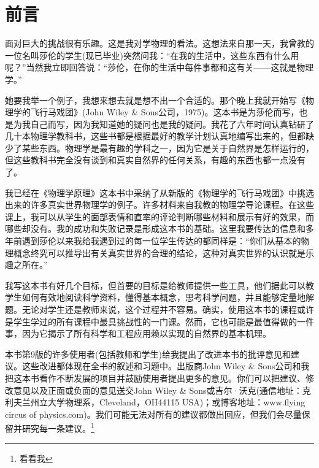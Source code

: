 


\chapter{前言}






面对巨大的挑战很有乐趣。这是我对学物理的看法。这想法来自那一天，我曾教的一位名叫莎伦的学生(现已毕业)突然问我：“在我的生活中，这些东西有什么用呢？”当然我立即回答说：“莎伦，在你的生活中每件事都和这有关——这就是物理学。”

她要我举一个例子，我想来想去就是想不出一个合适的。那个晚上我就开始写《物理学的飞行马戏团》(John Wiley \& Sons公司，1975)。这本书是为莎伦而写，也是为我自己而写，因为我知道她的疑问也是我的疑问。我花了六年时间认真钻研了几十本物理学教科书，这些书都是根据最好的教学计划认真地编写出来的，但都缺少了某些东西。物理学是最有趣的学科之一，因为它是关于自然界是怎样运行的，但这些教科书完全没有谈到和真实自然界的任何关系，有趣的东西也都一点没有了。

我已经在《物理学原理》这本书中采纳了从新版的《物理学的飞行马戏团》中挑选出来的许多真实世界物理学的例子。许多材料来自我教的物理学导论课程。在这些课上，我可以从学生的面部表情和直率的评论判断哪些材料和展示有好的效果，而哪些却没有。我的成功和失败记录是形成这本书的基础。这里我要传达的信息和多年前遇到莎伦以来我给我遇到过的每一位学生传达的都同样是：“你们从基本的物理概念终究可以推导出有关真实世界的合理的结论，这种对真实世界的认识就是乐趣之所在。”

我写这本书有好几个目标，但首要的目标是给教师提供一些工具，他们据此可以教学生如何有效地阅读科学资料，懂得基本概念，思考科学问题，并且能够定量地解题。无论对学生还是教师来说，这个过程并不容易。确实，使用这本书的课程或许是学生学过的所有课程中最具挑战性的一门课。然而，它也可能是最值得做的一件事，因为它揭示了所有科学和工程应用赖以实现的自然界的基本机理。

本书第9版的许多使用者(包括教师和学生)给我提出了改进本书的批评意见和建议。这些改进都体现在全书的叙述和习题中。出版商John Wiley \& Sons公司和我把这本书看作不断发展的项目并鼓励使用者提出更多的意见。你们可以把建议、修改意见以及正面或负面的意见送交John Wiley \& Sons或吉尔·沃克(通信地址：克利夫兰州立大学物理系，Cleveland，OH44115 USA)；或博客地址：www.flying circus of physics.com)。我们可能无法对所有的建议都做出回应，但我们会尽量保留并研究每一条建议。\footnote{看看我}


